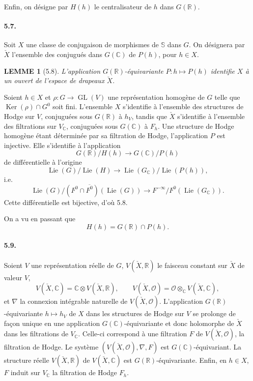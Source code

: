 \documentclass[10pt]{article}
\newcommand{\C}{\mathbb C}
\newcommand{\R}{\mathbb R}
\newcommand{\bS}{\mathbb S}
\newcommand{\cO}{\mathcal O}
\newcommand{\Ker}{\operatorname{Ker}}
\theoremstyle{deligne}
\newtheorem*{lemme}{LEMME}
\newcommand{\Lie}{\operatorname{Lie}}
\newcommand{\GL}{\operatorname{GL}}
\begin{document}
Enfin, on désigne par $H(h)$ le centralisateur de $h$ dans $G(\R)$.

\paragraph{5.7.}
Soit $X$ une classe de conjugaison de morphismes de $\bS$ dans $G$. On désignera par $\check X$ l'ensemble des conjugués dans $G(\C)$ de $P(h)$, pour $h\in X$.

\begin{lemme}[5.8]
L'application $G(\R)$-équivariante $P:h\mapsto P(h)$ identifie $X$ à un ouvert de l'espace de drapeaux $\check X$.
\end{lemme}

Soient $h\in X$ et $\rho:G\to\GL(V)$ une représentation homogène de $G$ telle que $\Ker(\rho)\cap G^0$ soit fini. L'ensemble $X$ s'identifie à l'ensemble des structures de Hodge sur $V$, conjuguées sous $G(\R)$ à $h_V$, tandis que $\check X$ s'identifie à l'ensemble des filtrations sur $V_\C$, conjuguées sous $G(\C)$ à $F_h$. Une structure de Hodge homogène étant déterminée par sa filtration de Hodge, l'application $P$ est injective. Elle s'identifie à l'application
\[
  G(\R)/H(h)\longrightarrow G(\C)/P(h)
\]
de différentielle à l'origine
\[
  \Lie(G)/\Lie(H)\longrightarrow \Lie(G_\C)/\Lie(P(h)),
\]
i.e.
\[
  \Lie(G)/(F^0\cap\overline{F^0})(\Lie(G))
  \longrightarrow
  F^{-\infty}/F^0(\Lie(G_\C)).
\]
Cette différentielle est bijective, d'où 5.8.

On a vu en passant que
\[
\tag{5.8.1}
  H(h)=G(\R)\cap P(h).
\]

\paragraph{5.9.}
Soient $V$ une représentation réelle de $G$, $V(\check X,\R)$ le faisceau constant sur $\check X$ de valeur $V$,
\[
  V(\check X,\C)=\C\otimes V(\check X,\R),\qquad
  V(\check X,\cO)=\cO\otimes_\C V(\check X,\C),
\]
et $\nabla$ la connexion intégrable naturelle de $V(\check X,\cO)$. L'application $G(\R)$-équivariante $h\mapsto h_V$ de $X$ dans les structures de Hodge sur $V$ se prolonge de façon unique en une application $G(\C)$-équivariante et donc holomorphe de $\check X$ dans les filtrations de $V_\C$. Celle-ci correspond à une filtration $F$ de $V(\check X,\cO)$, la filtration de Hodge. Le système $(V(\check X,\cO),\nabla,F)$ est $G(\C)$-équivariant. La structure réelle $V(\check X,\R)$ de $V(\check X,\C)$ est $G(\R)$-équivariante. Enfin, en $h\in X$, $F$ induit sur $V_\C$ la filtration de Hodge $F_h$.
\end{document}
